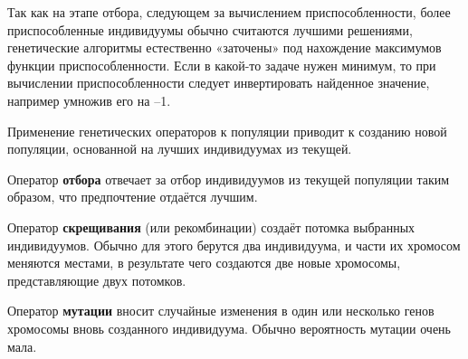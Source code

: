 Так как на этапе отбора, следующем за вычислением приспособленности, более приспособленные индивидуумы обычно считаются лучшими решениями, генетические алгоритмы естественно «заточены» под нахождение максимумов функции приспособленности. Если в какой-то задаче нужен минимум, то при вычислении приспособленности следует инвертировать найденное значение, например умножив его на –1.

Применение генетических операторов к популяции приводит к созданию новой популяции, основанной на лучших индивидуумах из текущей.

Оператор \textbf{отбора} отвечает за отбор индивидуумов из текущей популяции таким образом, что предпочтение отдаётся лучшим.

Оператор \textbf{скрещивания} (или рекомбинации) создаёт потомка выбранных индивидуумов. Обычно для этого берутся два индивидуума, и части их хромосом меняются местами, в результате чего создаются две новые хромосомы, представляющие двух потомков.

Оператор \textbf{мутации} вносит случайные изменения в один или несколько генов хромосомы вновь созданного индивидуума. Обычно вероятность мутации очень мала.

\clearpage
